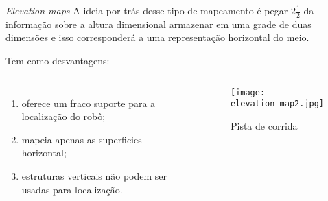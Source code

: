 \begin{frame}[t]{\textit{Elevation maps}} 
    \transdissolve[duration=0.5]
    A ideia por trás desse tipo de mapeamento é pegar $2\frac{1}{2}$ da informação sobre a altura dimensional armazenar em uma grade de duas dimensões e isso corresponderá a uma representação horizontal do meio.
    
    Tem como desvantagens:
        \begin{columns}[t]
                \begin{enumerate}
                    \item oferece um fraco suporte para a localização do robô;
                    \item mapeia apenas as superficies horizontal;
                    \item estruturas verticais não podem ser usadas para localização.
                \end{enumerate}
            \begin{center}
                \begin{figure}
                    \texttt{[image: elevation\_map2.jpg]}
                    \caption{Pista de corrida \cite{agostini2007}}
                \end{figure}
            \end{center}
        \end{columns}
\end{frame}

